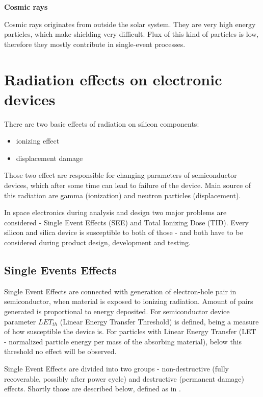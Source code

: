     \bigskip \textbf{Cosmic rays}

    Cosmic rays originates from outside the solar system. They are very high energy particles, which make shielding very difficult. Flux of this kind of particles is low, therefore they mostly contribute in single-event processes.

\section{Radiation effects on electronic devices}
    There are two basic effects of radiation on silicon components:
    \begin{itemize}
        \item ionizing effect
        \item displacement damage
    \end{itemize}

    Those two effect are responsible for changing parameters of semiconductor devices, which after some time can lead to failure of the device. Main source of this radiation are gamma (ionization) and neutron particles (displacement).

    In space electronics during analysis and design two major problems are considered - Single Event Effects (SEE) and Total Ionizing Dose (TID). Every silicon and silica device is susceptible to both of those - and both have to be considered during product design, development and testing.

    \subsection{Single Events Effects}
        Single Event Effects are connected with generation of electron-hole pair in semiconductor, when material is exposed to ionizing radiation. Amount of pairs generated is proportional to energy deposited. For semiconductor device parameter $LET_{th}$ (Linear Energy Transfer Threshold) is defined, being a measure of how susceptible the device is. For particles with Linear Energy Transfer (LET - normalized particle energy per mass of the absorbing material), below this threshold no effect will be observed.

        Single Event Effects are divided into two groups - non-destructive (fully recoverable, possibly after power cycle) and destructive (permanent damage) effects. Shortly those are described below, defined as in \cite{ECSS_Q_ST_60_15C}.

